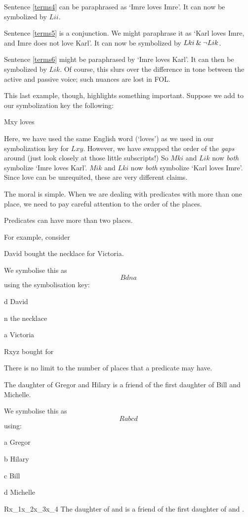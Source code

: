 Sentence \ref{terms4} can be paraphrased as `Imre loves Imre'. It can now be symbolized by $Lii$.

Sentence \ref{terms5} is a conjunction. We might paraphrase it as `Karl loves Imre, and Imre does not love Karl'. It can now be symbolized by $Lki \mathbin{\&} \neg Lik$.

Sentence \ref{terms6} might be paraphrased by `Imre loves Karl'. It can then be symbolized by $Lik$. Of course, this slurs over the difference in tone between the active and passive voice; such nuances are lost in FOL.

This last example, though, highlights something important. Suppose we add to our symbolization key the following:
	\begin{ekey}
		\item[Mxy]  loves 
	\end{ekey}
Here, we have used the same English word (`loves') as we used in our symbolization key for $Lxy$. However, we have swapped the order of the \emph{gaps} around (just look closely at those little subscripts!) So $Mki$ and $Lik$ now \emph{both} symbolize `Imre loves Karl'. $Mik$ and $Lki$ now \emph{both} symbolize `Karl loves Imre'. Since love can be unrequited, these are very different claims.

The moral is simple. When we are dealing with predicates with more than one place, we need to pay careful attention to the order of the places.




Predicates can have more than two places.

For example, consider
\begin{earg}
\item[\ex{folbought}] David bought the necklace for Victoria.
\end{earg}
We symbolise this as $$Bdna$$ using the symbolisation key:
\begin{ekey}
\item[d] David
\item[n] the necklace
\item[a] Victoria
\item[Rxyz]  bought  for 
\end{ekey}

There is no limit to the number of places that a predicate may have.
\begin{earg}
\item[\ex{folmulti}] The daughter of Gregor and Hilary is a friend of the first daughter of Bill and Michelle.
\end{earg}
We symbolise this as $$Rabcd$$ using:
\begin{ekey}
\item[a] Gregor
\item[b] Hilary
\item[c] Bill
\item[d] Michelle
\item[Rx_1x_2x_3x_4] The daughter of  and  is a friend of the first daughter of  and .
\end{ekey}






